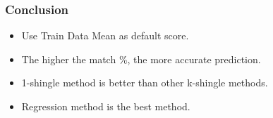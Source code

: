 \documentclass[11pt]{beamer}
\begin{document}
\begin{frame}
\frametitle{Conclusion}
	
	\begin{itemize}
		[square]
		\item Use Train Data Mean as default score.
		\item The higher the match \%, the more accurate prediction.
		\item 1-shingle method is better than other k-shingle methods.
		\item Regression method is the best method.
	\end{itemize}		
	

	


\end{frame}
\end{document}
